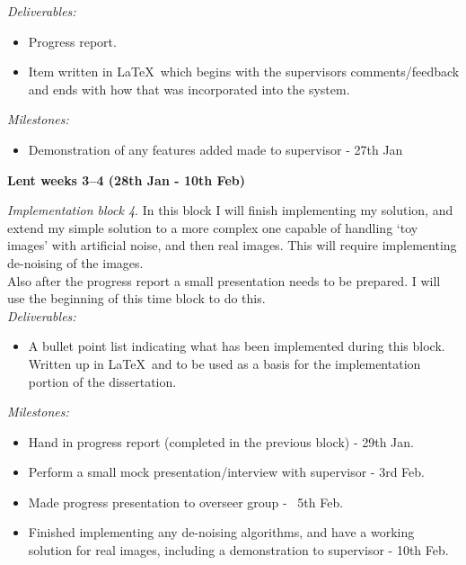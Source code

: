 \documentclass[12pt,a4paper,twoside]{article}
\begin{document}
{\em Deliverables:} 
\begin{itemize} 
    \item 
    Progress report.
    \item 
    Item written in \LaTeX\ which begins with the supervisors comments/feedback 
    and ends with how that was incorporated into the system.
\end{itemize}

{\em Milestones:}
\begin{itemize}
    \item 
    Demonstration of any features added made to supervisor - 27th Jan
\end{itemize}




{\bf Lent weeks 3--4 (28th Jan - 10th Feb)} 

{\em Implementation block 4}. In this block I will finish implementing my 
solution, and extend my simple solution to a more complex one capable of 
handling `toy images' with artificial noise, and then real images. This will 
require implementing de-noising of the images. \\

Also after the progress report a small presentation needs to be prepared. I 
will use the beginning of this time block to do this. \\

{\em Deliverables:} 
\begin{itemize} 
    \item 
    A bullet point list indicating what has been implemented during this block. 
    Written up in \LaTeX\ and to be used as a basis for the implementation 
    portion of the dissertation.
\end{itemize}

{\em Milestones:}
\begin{itemize}
    \item 
    Hand in progress report (completed in the previous block) - 29th Jan.
    \item 
    Perform a small mock presentation/interview with supervisor - 3rd Feb.
    \item 
    Made progress presentation to overseer group - ~5th Feb.
    \item 
    Finished implementing any de-noising algorithms, and have a working solution 
    for real images, including a demonstration to supervisor - 10th Feb.
\end{itemize}
\end{document}
